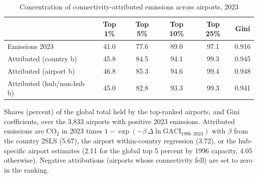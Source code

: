 \begin{table}[htbp]
\centering
\begin{threeparttable}
\caption{Concentration of connectivity-attributed emissions across airports, 2023}
\label{tab:airport_conc}
\footnotesize
\begin{tabular}{lccccc}
\toprule
 & Top 1\% & Top 5\% & Top 10\% & Top 25\% & Gini \\
\midrule
  Emissions 2023 & 41.0 & 77.6 & 89.0 & 97.1 & 0.916 \\
  Attributed (country b) & 45.8 & 84.5 & 94.1 & 99.3 & 0.945 \\
  Attributed (airport b) & 46.8 & 85.3 & 94.6 & 99.4 & 0.948 \\
  Attributed (hub/non-hub b) & 45.0 & 82.8 & 93.3 & 99.3 & 0.941 \\
\bottomrule
\end{tabular}
\begin{tablenotes}\footnotesize
\item Shares (percent) of the global total held by the top-ranked airports, and Gini coefficients, over the 3,833 airports with positive 2023 emissions. Attributed emissions are CO$_2$ in 2023 times $1-\exp(-\beta\,\Delta\ln \mathrm{GACI}_{1996\text{--}2023})$ with $\beta$ from the country 2SLS (5.67), the airport within-country regression (3.72), or the hub-specific airport estimates (2.11 for the global top 5 percent by 1996 capacity, 4.05 otherwise). Negative attributions (airports whose connectivity fell) are set to zero in the ranking.
\end{tablenotes}
\end{threeparttable}
\end{table}
